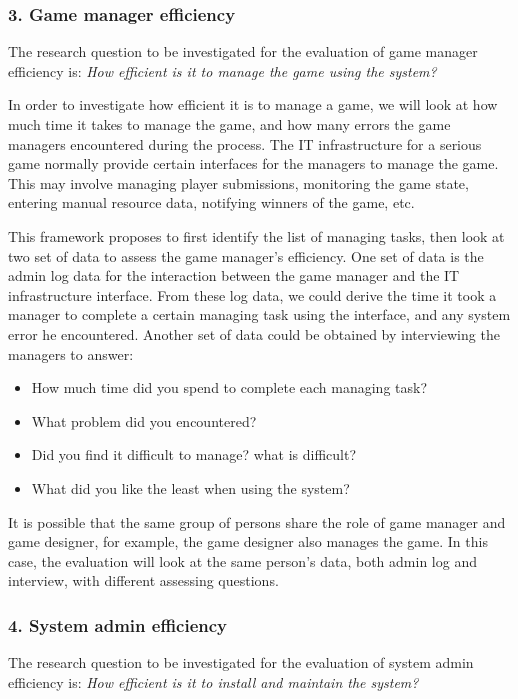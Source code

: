 \documentclass{sigchi}
\begin{document}
\subsubsection{3. Game manager efficiency}
The research question to be investigated for the evaluation of game manager efficiency is: \emph{How efficient is it to manage the game using the system?}

In order to investigate how efficient it is to manage a game, we will look at how much time it takes to manage the game, and how many errors the game managers encountered during the process.
The IT infrastructure for a serious game normally provide certain interfaces for the managers to manage the game. This may involve managing player submissions, monitoring the game state, entering manual resource data, notifying winners of the game, etc.

This framework proposes to first identify the list of managing tasks, then look at two set of data to assess the game manager's efficiency. One set of data is the admin log data for the interaction between the game manager and the IT infrastructure interface. From these log data, we could derive the time it took a manager to complete a certain managing task using the interface, and any system error he encountered. Another set of data could be obtained by interviewing the managers to answer:
\begin{itemize}
\item How much time did you spend to complete each managing task?
\item What problem did you encountered?
\item Did you find it difficult to manage? what is difficult?
\item What did you like the least when using the system?
\end{itemize}

It is possible that the same group of persons share the role of game manager and game designer, for example, the game designer also manages the game. In this case, the evaluation will look at the same person's data, both admin log and interview, with different assessing questions.

\subsubsection{4. System admin efficiency}
The research question to be investigated for the evaluation of system admin efficiency is: \emph{How efficient is it to install and maintain the system?}
\end{document}

